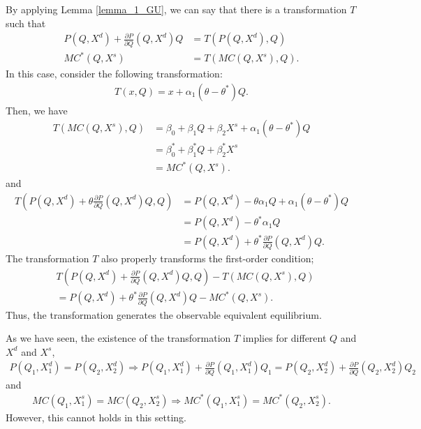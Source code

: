 \documentclass[11pt, a4paper]{article}
\theoremstyle{remark}
\begin{document}
By applying Lemma \ref{lemma_1_GU}, we can say that there is a transformation $T$ such that
\begin{align}
    P(Q, X^d) + \frac{\partial P}{\partial Q}(Q, X^d) Q & = T(P(Q, X^d), Q)\\
    MC^{*}(Q, X^s) &= T(MC(Q, X^s), Q).
\end{align}
In this case, consider the following transformation:
\begin{align}
    T(x, Q) = x + \alpha_1(\theta - \theta^{*})Q.
\end{align}
Then, we have
\begin{align}
    T(MC(Q, X^s), Q) & =  \beta_0 + \beta_1 Q + \beta_2 X^s + \alpha_1(\theta - \theta^{*})Q\\
    & = \beta_0^{*} + \beta_1^{*} Q + \beta_2^{*} X^s\\
    & = MC^{*}(Q, X^s).
\end{align}
and
\begin{align}
    T\left(P(Q, X^d) + \theta \frac{\partial P}{\partial Q}(Q, X^d) Q, Q\right) & = P(Q, X^d) -\theta \alpha_1 Q +  \alpha_1(\theta - \theta^{*})Q\\ 
    & = P(Q, X^d) - \theta^{*} \alpha_1 Q  \\
    & = P(Q, X^d) + \theta^{*} \frac{\partial P}{\partial Q}(Q, X^d) Q.
\end{align}
The transformation $T$ also properly transforms the first-order condition;
\begin{align}
    &T\left(P(Q, X^d) + \frac{\partial P}{\partial Q}(Q, X^d) Q, Q\right) - T(MC(Q, X^s), Q)\\
    &= P(Q, X^d) + \theta^{*} \frac{\partial P}{\partial Q}(Q, X^d) Q - MC^{*}(Q, X^s).
\end{align}
Thus, the transformation generates the observable equivalent equilibrium.






As we have seen, the existence of the transformation $T$ implies for different $Q$ and $X^d$ and $X^s$,
\begin{align}
    P(Q_1, X^{d}_1) = P(Q_2, X^{d}_2) \Longrightarrow P(Q_1, X^{d}_1) + \frac{\partial P}{\partial Q}(Q_1, X^{d}_1) Q_1 = P(Q_2, X^{d}_2) + \frac{\partial P}{\partial Q}(Q_2, X^{d}_2) Q_2
\end{align}
and
\begin{align}
    MC(Q_1, X^{s}_1) = MC(Q_2, X^{s}_2) \Longrightarrow MC^*(Q_1, X^{s}_1) = MC^*(Q_2, X^{s}_2).
\end{align}
However, this cannot holds in this setting.
\end{document}
